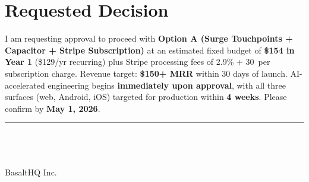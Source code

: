 \documentclass[11pt, letterpaper]{article}
\begin{document}
\section{Requested Decision}

\begin{actionbox}
I am requesting approval to proceed with \textbf{Option A (Surge Touchpoints + Capacitor + Stripe Subscription)} at an estimated fixed budget of \textbf{\$154 in Year 1} (\$129/yr recurring) plus Stripe processing fees of 2.9\% + 30\textcent\ per subscription charge. Revenue target: \textbf{\$150+ MRR} within 30 days of launch. AI-accelerated engineering begins \textbf{immediately upon approval}, with all three surfaces (web, Android, iOS) targeted for production within \textbf{4 weeks}. Please confirm by \textbf{May 1, 2026}.
\end{actionbox}


\vspace{2em}

\noindent\rule{5cm}{0.4pt}\\[4pt]
\noindent\textbf{\docAuthorName}\\
\noindent\textit{\docAuthorTitle}\\
\noindent BasaltHQ Inc.
\end{document}
